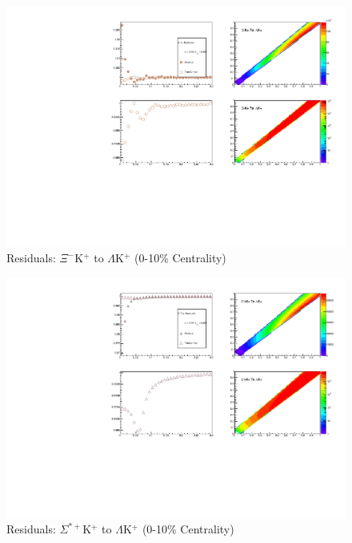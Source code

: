 \documentclass[../AnalysisNoteJBuxton.tex]{subfiles}
\begin{document}
\begin{figure}[h]
  \centering
  \includegraphics[width=\textwidth]{9_AdditionalFigures/Figures/Residuals/LamKchP/Residuals_LamKchP_0010_XiKchP_MomResCrctn_NonFlatBgdCrctn_ResidualsIncluded_UsingCoulombOnlyInterpCfs.pdf}
  \caption[Residuals: $\Xi^{-}$K$^{+}$ to $\Lambda$K$^{+}$ (0-10\% Centrality)]{Residuals: $\Xi^{-}$K$^{+}$ to $\Lambda$K$^{+}$ (0-10\% Centrality)}
  \label{fig:Res_LamKchP_0010_XiCKchP}
\end{figure}


\begin{figure}[h]
  \centering
  \includegraphics[width=\textwidth]{9_AdditionalFigures/Figures/Residuals/LamKchP/Residuals_LamKchP_0010_SigStPKchP_MomResCrctn_NonFlatBgdCrctn_ResidualsIncluded_UsingCoulombOnlyInterpCfs.pdf}
  \caption[Residuals: $\Sigma^{*+}$K$^{+}$ to $\Lambda$K$^{+}$ (0-10\% Centrality)]{Residuals: $\Sigma^{*+}$K$^{+}$ to $\Lambda$K$^{+}$ (0-10\% Centrality)}
  \label{fig:Res_LamKchP_0010_SigStPKchP}
\end{figure}
\end{document}
